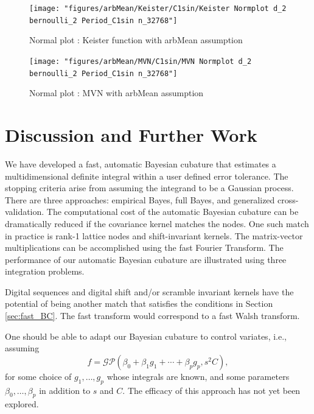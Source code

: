 \documentclass[twocolumn]{svjour3}          %
\begin{document}
\begin{figure}
	\centering
	\texttt{[image: "figures/arbMean/Keister/C1sin/Keister Normplot d\_2 bernoulli\_2 Period\_C1sin n\_32768"]}
	\caption{Normal plot : Keister function with arbMean assumption}
	\label{fig:keister-normplot}
\end{figure}




\begin{figure}
	\centering
	\texttt{[image: "figures/arbMean/MVN/C1sin/MVN Normplot d\_2 bernoulli\_2 Period\_C1sin n\_32768"]}
	\caption{Normal plot : MVN with arbMean assumption}
	\label{fig:mvn-normplot}
\end{figure}

\fi




\section{Discussion and Further Work}

We have developed a fast, automatic Bayesian cubature that estimates a multidimensional definite integral within a user defined error tolerance.  The stopping criteria arise from assuming the integrand to be a Gaussian process.  There are three approaches:  empirical Bayes, full Bayes, and generalized cross-validation.  The computational cost of the automatic Bayesian cubature can be dramatically reduced if the covariance kernel matches the nodes.  One such match in practice is rank-1 lattice nodes and shift-invariant kernels.  The matrix-vector multiplications can be accomplished using the fast Fourier Transform.  The performance of our automatic Bayesian cubature are illustrated using three integration problems.  

Digital sequences and digital shift and/or scramble invariant kernels have the potential of being another match that satisfies the conditions in Section \ref{sec:fast_BC}.  The fast transform would correspond to a fast Walsh transform.  


One should be able to adapt our Bayesian cubature to control variates, i.e., assuming  
\begin{equation*}
f = \mathcal{GP} \left( \beta_0 + \beta_1 g_1 + \cdots + \beta_p g_p, s^2 C \right),
\end{equation*}
for some choice of $g_1, \ldots, g_p$ whose integrals are known, and some parameters $\beta_0, \ldots, \beta_p$ in addition to $s$ and $C$.  The efficacy of this approach has not yet been explored.
\end{document}
